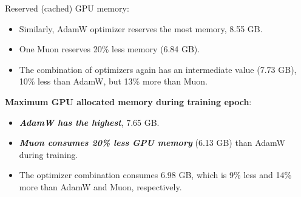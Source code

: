 \documentclass{report}
\begin{document}
\noindent Reserved (cached) GPU memory:
\begin{itemize}
    \item Similarly, AdamW optimizer reserves the most memory, 8.55 GB.
    \item One Muon reserves 20\% less memory (6.84 GB).
    \item The combination of optimizers again has an intermediate value (7.73 GB), 10\% less than AdamW, but 13\% more than Muon.
\end{itemize}

\noindent \textbf{Maximum GPU allocated memory during training epoch}:
\begin{itemize}
    \item \textit{\textbf{AdamW has the highest}}, 7.65 GB.
    \item \textit{\textbf{Muon consumes 20\% less GPU memory}} (6.13 GB) than AdamW during training.
    \item The optimizer combination consumes 6.98 GB, which is 9\% less and 14\% more than AdamW and Muon, respectively.
\end{itemize}
\end{document}
